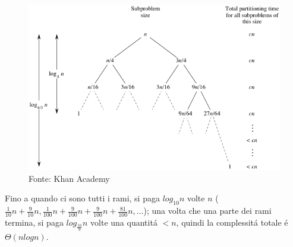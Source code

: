 \documentclass{article}
\begin{document}
\begin{figure}
\includegraphics[scale=0.5]{quick-sort.png}
\caption{Fonte: Khan Academy}
\end{figure}

Fino a quando ci sono tutti i rami, si paga $log_{10}n$ volte $n$ ($\frac{1}{10}n+\frac{9}{10}n, \frac{1}{100}n+\frac{9}{100}n+\frac{9}{100}n+\frac{81}{100}n, \dots$); una volta che una parte dei rami termina, si paga $\displaystyle log_{\frac{10}{9}}n$ volte una quantitá $< n$, quindi la complessitá totale é $\Theta(nlogn)$.
\end{document}
